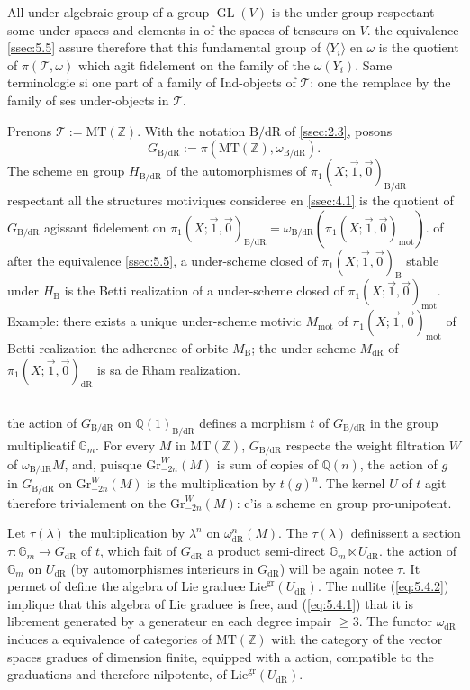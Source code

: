 \documentclass[11pt,a4paper]{article}
\theoremstyle{plain}
\theoremstyle{definition}
\DeclareMathOperator{\GL}{GL}
\newcommand{\Z}{\mathbb{Z}}
\newcommand{\Q}{\mathbb{Q}}
\newcommand{\Gm}{\mathbb{G}_m}
\newcommand{\dR}{\mathrm{dR}}
\newcommand{\B}{\mathrm{B}}
\newcommand{\mot}{\mathrm{mot}}
\newcommand{\gr}{\mathrm{gr}}
\newcommand{\Gr}{\mathrm{Gr}}
\newcommand{\MT}{\mathrm{MT}}
\begin{document}
All under-algebraic group of a group $\GL(V)$ is the under-group respectant some under-spaces and elements in of the spaces of tenseurs on $V$. the equivalence \ref{ssec:5.5} assure therefore that this fundamental group of $\langle Y_i \rangle$ en $\omega$ is the quotient of $\pi(\mathcal{T},\omega)$ which agit fidelement on the family of the $\omega(Y_i)$. Same terminologie si one part of a family of Ind-objects of $\mathcal{T}$: one the remplace by the family of ses under-objects in $\mathcal{T}$.

Prenons $\mathcal{T} := \MT(\Z)$. With the notation $\B/\dR$ of \ref{ssec:2.3}, posons
\begin{equation}\label{eq:5.6.1}
G_{\B/\dR} := \pi(\MT(\Z), \omega_{\B/\dR}).
\end{equation}
The scheme en group $H_{\B/\dR}$ of the automorphismes of $\pi_1(X;\vec{1},\vec{0})_{\B/\dR}$ respectant all the structures motiviques consideree en \ref{ssec:4.1} is the quotient of $G_{\B/\dR}$ agissant fidelement on $\pi_1(X;\vec{1},\vec{0})_{\B/\dR} = \omega_{\B/\dR}(\pi_1(X;\vec{1},\vec{0})_{\mot})$. of after the equivalence \ref{ssec:5.5}, a under-scheme closed of $\pi_1(X;\vec{1},\vec{0})_{\B}$ stable under $H_{\B}$ is the Betti realization of a under-scheme closed of $\pi_1(X;\vec{1},\vec{0})_{\mot}$. Example: there exists a unique under-scheme motivic $M_{\mot}$ of $\pi_1(X;\vec{1},\vec{0})_{\mot}$ of Betti realization the adherence of orbite $M_{\B}$; the under-scheme $M_{\dR}$ of $\pi_1(X;\vec{1},\vec{0})_{\dR}$ is sa de Rham realization.

\subsection{}\label{ssec:5.7}

the action of $G_{\B/\dR}$ on $\Q(1)_{\B/\dR}$ defines a morphism $t$ of $G_{\B/\dR}$ in the group multiplicatif $\Gm$. For every $M$ in $\MT(\Z)$, $G_{\B/\dR}$ respecte the weight filtration $W$ of $\omega_{\B/\dR} M$, and, puisque $\Gr^W_{-2n}(M)$ is sum of copies of $\Q(n)$, the action of $g$ in $G_{\B/\dR}$ on $\Gr^W_{-2n}(M)$ is the multiplication by $t(g)^n$. The kernel $U$ of $t$ agit therefore trivialement on the $\Gr^W_{-2n}(M)$: c'is a scheme en group pro-unipotent.

Let $\tau(\lambda)$ the multiplication by $\lambda^n$ on $\omega_{\dR}^n(M)$. The $\tau(\lambda)$ definissent a section $\tau: \Gm \to G_{\dR}$ of $t$, which fait of $G_{\dR}$ a product semi-direct $\Gm \ltimes U_{\dR}$. the action of $\Gm$ on $U_{\dR}$ (by automorphismes interieurs in $G_{\dR}$) will be again notee $\tau$. It permet of define the algebra of Lie graduee $\mathrm{Lie}^{\gr}(U_{\dR})$. The nullite (\ref{eq:5.4.2}) implique that this algebra of Lie graduee is free, and (\ref{eq:5.4.1}) that it is librement generated by a generateur en each degree impair $\geq 3$. The functor $\omega_{\dR}$ induces a equivalence of categories of $\MT(\Z)$ with the category of the vector spaces gradues of dimension finite, equipped with a action, compatible to the graduations and therefore nilpotente, of $\mathrm{Lie}^{\gr}(U_{\dR})$.
\end{document}
